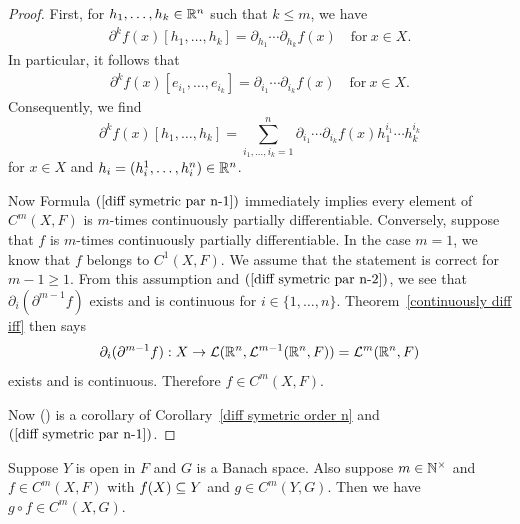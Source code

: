 \begin{proof}
First, for $h_1,\dots,h_k\in \mathbb{R}^n$ such that $k\leq m$, we have
\begin{align}\label{diff symetric par n-1}
\partial^kf(x)[h_1,\dots,h_k]=\partial_{h_1}\cdots\partial_{h_k}f(x) \quad\text{for}\ x\in X.
\end{align}
In particular, it follows that
\begin{align}\label{diff symetric par n-2}
\partial^kf(x)[e_{i_1},\dots,e_{i_k}]=\partial_{i_1}\cdots\partial_{i_k} f(x)\quad\text{for}\ x\in X.
\end{align}
Consequently, we find
\[\partial^kf(x)[h_1,\dots,h_k]=\sum_{i_1,\dots,i_k=1}^{n}\partial_{i_1}\cdots\partial_{i_k}f(x)h_1^{i_1}\cdots h_k^{i_k}\]
for $x\in X$ and $h_i=(h^1_i,\dots,h^n_i)\in\mathbb{R}^n$.\par
Now Formula $(\ref{diff symetric par n-1})$ immediately implies every element of $C^m(X,F)$ is $m$-times continuously partially differentiable. Conversely, suppose that $f$ is $m$-times continuously partially differentiable. In the case $m=1$, we know that $f$ belongs to $C^1(X,F)$. We assume that the statement is correct for $m-1\geq 1$. From this assumption and $(\ref{diff symetric par n-2})$, we see that $\partial_i(\partial^{m-1}f)$ exists and is continuous for $i\in\{1,\dots,n\}$. Theorem~\ref{continuously diff iff} then says
\[\partial_i(\partial^{m-1}f): X\to \mathcal{L}(\mathbb{R}^n,\mathcal{L}^{m-1}(\mathbb{R}^n,F))=\mathcal{L}^{m}(\mathbb{R}^n,F)\]
exists and is continuous. Therefore $f\in C^m(X,F)$.\par
Now () is a corollary of Corollary~\ref{diff symetric order n} and $(\ref{diff symetric par n-1})$.
\end{proof}
\begin{theorem}
Suppose $Y$ is open in $F$ and $G$ is a Banach space. Also suppose $m\in\mathbb{N}^{\times}$
and $f\in C^m(X,F)$ with $f(X)\subseteq Y$ and $g\in C^m(Y,G)$. Then we have $g\circ f\in C^m(X,G)$.
\end{theorem}
